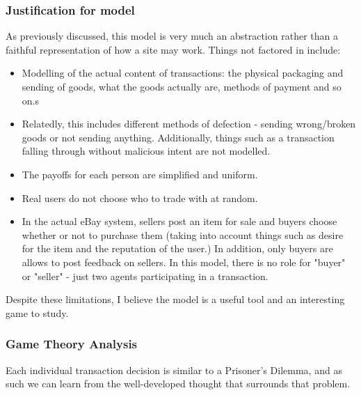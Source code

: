 \documentclass{article}
\begin{document}
\subsubsection{Justification for model}
\label{sec:justification-model}
As previously discussed, this model is very much an abstraction rather than a faithful representation of how a site may work. Things not factored in include:
\begin{itemize}
	\item Modelling of the actual content of transactions: the physical packaging and sending of goods, what the goods actually are, methods of payment and so on.s
	\item Relatedly, this includes different methods of defection - sending wrong/broken goods or not sending anything. Additionally, things such as a transaction falling through without malicious intent are not modelled.\cite{gregg2008typology}
	\item The payoffs for each person are simplified and uniform.
	\item Real users do not choose who to trade with at random.
	\item In the actual eBay system, sellers post an item for sale and buyers choose whether or not to purchase them (taking into account things such as desire for the item and the reputation of the user.) In addition, only buyers are allows to post feedback on sellers. In this model, there is no role for "buyer" or "seller" - just two agents participating in a transaction.
\end{itemize}

Despite these limitations, I believe the model is a useful tool and an interesting game to study.


\subsubsection{Game Theory Analysis}
\label{sec:game-theory}
Each individual transaction decision is similar to a Prisoner's Dilemma, and as such we can learn from the well-developed thought that surrounds that problem.
\end{document}
